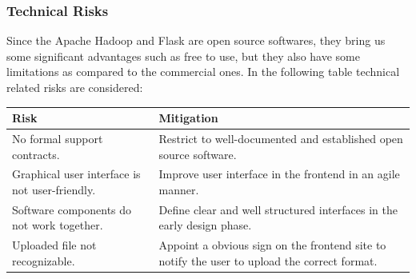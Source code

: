 \documentclass[runningheads]{llncs}
\begin{document}
\subsubsection{Technical Risks}

Since the Apache Hadoop and Flask are open source softwares, they bring us some significant advantages such as free to use, but they also have some limitations as compared to the commercial ones. In the following table technical related risks are considered:\\

\renewcommand\arraystretch{1.5}
\begin{tabular}{p{5cm}|p{6cm}}
	Risk& Mitigation\\
	\hline
	No formal support contracts.& Restrict to well-documented and established open
	source software.\\
	\hline
	Graphical user interface is not user-friendly.& Improve user interface in the frontend in an agile manner.\\
	\hline
	Software components do not work together.& Define clear and well structured interfaces in the early design phase.\\
	\hline
	Uploaded file not recognizable.& Appoint a obvious sign on the frontend site to notify the user to upload the correct format.\\
\end{tabular}
\end{document}
